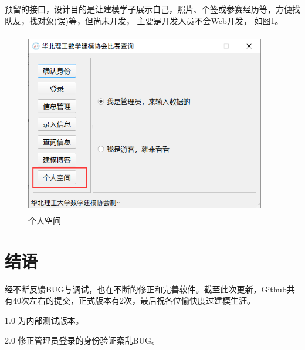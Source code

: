 \documentclass[cn, 11pt, chinese, show]{elegantbook}
\begin{document}
预留的接口，设计目的是让建模学子展示自己，照片、个签或参赛经历等，方便找队友，找对象(误)等，但尚未开发，
主要是开发人员不会Web开发， 如图\ref{fig:space}。

\begin{figure}[h]
    \centering
    \includegraphics[width=10.5cm, height=8cm]{figure/11.png}
    \caption{个人空间}
    \label{fig:space}
\end{figure}

\chapter{结语}

经不断反馈BUG与调试，也在不断的修正和完善软件。截至此次更新，Github共有40次左右的提交，正式版本有2次，最后祝各位愉快度过建模生涯。


\begin{change}
  \item 1.0 为内部测试版本。
  \item 2.0 修正管理员登录的身份验证紊乱BUG。
\end{change}
\end{document}
